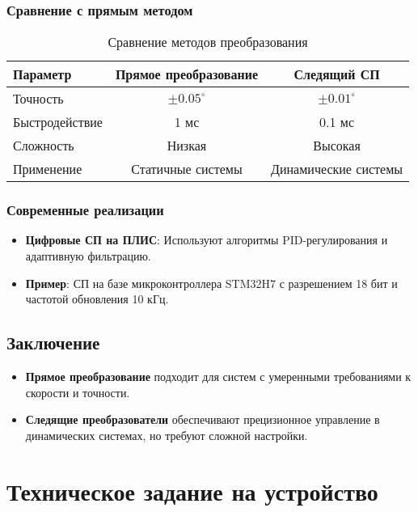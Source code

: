 \subsubsection*{Сравнение с прямым методом}
\begin{table}[ht]
    \centering
    \caption{Сравнение методов преобразования}
    \begin{tabular}{|l|c|c|}
        \hline
        \textbf{Параметр} & \textbf{Прямое преобразование} & \textbf{Следящий СП} \\ \hline
        Точность & \(\pm0.05^\circ\) & \(\pm0.01^\circ\) \\ \hline
        Быстродействие & 1 мс & 0.1 мс \\ \hline
        Сложность & Низкая & Высокая \\ \hline
        Применение & Статичные системы & Динамические системы \\ \hline
    \end{tabular}
\end{table}

\subsubsection*{Современные реализации}
\begin{itemize}
    \item \textbf{Цифровые СП на ПЛИС}: Используют алгоритмы PID-регулирования и адаптивную фильтрацию.
    \item \textbf{Пример}: СП на базе микроконтроллера STM32H7 с разрешением 18 бит и частотой обновления 10 кГц.
\end{itemize}

\subsection*{Заключение}
\begin{itemize}
    \item \textbf{Прямое преобразование} подходит для систем с умеренными требованиями к скорости и точности.
    \item \textbf{Следящие преобразователи} обеспечивают прецизионное управление в динамических системах, но требуют сложной настройки.
\end{itemize}




\section{Техническое задание на устройство}

